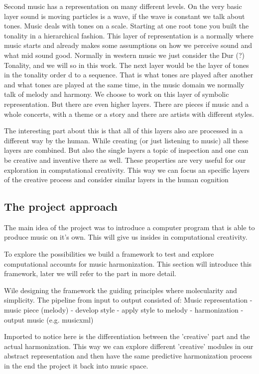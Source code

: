 Second music has a representation on many different levels. On the very basic layer sound is moving particles is a wave, if the wave is constant we talk about tones. Music deals with tones on a scale. Starting at one root tone you built the tonality in a hierarchical fashion. This layer of representation is a normally where music starts and already makes some assumptions on how we perceive sound and what mid sound good. Normally in western music we just consider the Dur (?) Tonality, and we will so in this work. The next layer would be the layer of tones in the tonality order d to a sequence. That is what tones are played after another and what tones are played at the same time, in the music domain we normally talk of melody and harmony. We choose to work on this layer of symbolic representation. But there are even higher layers. There are pieces if music and a whole concerts, with a theme or a story and there are artists with different styles.

The interesting part about this is that all of this layers also are processed in a different way by the human. While creating (or just listening to music) all these layers are combined. But also the single layers a topic of inspection and one can be creative and inventive there as well. These properties are very useful for our exploration in computational creativity. This way we can focus an specific layers of the creative process and consider similar layers in the human cognition

\subsection{The project approach}
The main idea of the project was to introduce a computer program that is able to produce music on it's own. This will give us insides in computational creativity.

To explore the possibilities we build a framework to test and explore computational accounts for music harmonization. This section will introduce  this framework, later we will refer to the part in more detail.

Wile designing the framework the guiding principles where molecularity and simplicity. The pipeline from input to output consisted of: Music representation - music piece (melody) - develop style - apply style to melody - harmonization - output music (e.g. musicxml)

Imported to notice here is the differentiation between the 'creative' part and the actual harmonization. This way we can explore different 'creative' modules in our abstract representation and then have the same predictive harmonization process in the end the project it back into music space.

